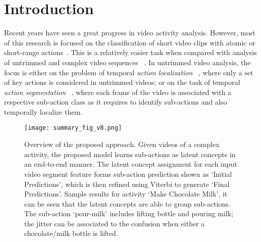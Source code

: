 \documentclass[final]{cvpr}
\begin{document}
\section{Introduction}
\par Recent years have seen a great progress in video activity analysis. However, most of this research is focused on the classification of short video clips with atomic or short-range actions~\cite{ rl-a-carreira2017quo, rl-a-feichtenhofer2019slowfast, rl-a-simonyan2014two}. This is a relatively easier task when compared with analysis of untrimmed and complex video sequences
~\cite{aakur2019perceptual, Alayrac16unsupervised,  hussein2019timeception, hussein2019videograph, bf-Kuehne12, kuehne2016end, sener2018unsupervised, rl-c-shou2017cdc,  rl-c-yeung2016end}. In untrimmed video analysis, the focus is either on the problem of temporal {\em action localization} ~\cite{ad-chen2019relation, ad-long2019gaussian, ad-xu2019g, ad-zeng2019graph}, where only a set of key actions is considered in untrimmed videos; or on the task of temporal {\em action segmentation} ~\cite{kuehne2016end, sener2018unsupervised, tcfpn-ding2018weakly, as-Richard_2018_CVPR, kukleva2019unsupervised, as-Farha_2019_CVPR}, where each frame of the video is associated with a respective sub-action class as it requires to identify sub-actions and also temporally localize them.  

\begin{figure}[t]
  \texttt{[image: summary\_fig\_v8.png]}
\caption{{\small Overview of the proposed approach. Given videos of a complex activity, the proposed model learns sub-actions as latent concepts in an end-to-end manner.
The latent concept assignment for each input video segment feature forms sub-action prediction shown as `Initial Predictions', which is then refined using Viterbi to generate `Final Predictions'. Sample results for activity `Make Chocolate Milk', it can be seen that the latent concepts are able to group sub-actions. The sub-action `pour-milk' includes lifting bottle and pouring milk; the jitter can be associated to the confusion when either a chocolate/milk bottle is lifted. 
}}
\vspace{-0.3cm}
\label{fig:summ}
\end{figure}
\vspace{-0.15cm}
\end{document}
